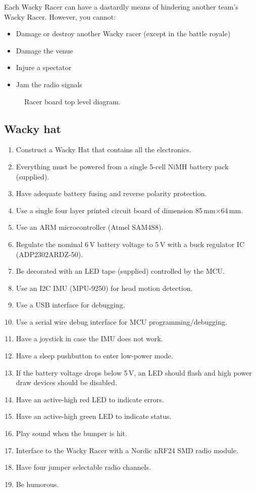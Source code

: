\documentclass[11pt, a4paper]{article}
\begin{document}
Each Wacky Racer can have a dastardly means of hindering another
team's Wacky Racer.  However, you cannot:
%
\begin{itemize}
\item Damage or destroy another Wacky racer (except in the battle royale)
\item Damage the venue
\item Injure a spectator
\item Jam the radio signals
\end{itemize}


\vspace{1cm}

\begin{figure}[h]
    \centering
    
    \caption{Racer board top level diagram.}
\end{figure}


\vfill\pagebreak

\subsection{Wacky hat}


\begin{enumerate}
\item Construct a Wacky Hat that contains all the electronics.
\item Everything must be powered from a single 5-cell NiMH battery pack (supplied).
\item Have adequate battery fusing and reverse polarity protection.
\item Use a single four layer printed circuit board of dimension 85\,mm$\times$64\,mm.
\item Use an ARM microcontroller (Atmel SAM4S8).
\item Regulate the nominal 6\,V battery voltage to 5\,V with a buck
  regulator IC (ADP2302ARDZ-50).
\item Be decorated with an LED tape (supplied) controlled by the MCU.
\item Use an I2C IMU (MPU-9250) for head motion detection.
\item Use a USB interface for debugging.
\item Use a serial wire debug interface for MCU programming/debugging.
\item Have a joystick in case the IMU does not work.
\item Have a sleep pushbutton to enter low-power mode.
\item If the battery voltage drops below 5\,V, an LED should flash and high power draw devices should be disabled.
\item Have an active-high red LED to indicate errors.
\item Have an active-high green LED to indicate status.
\item Play sound when the bumper is hit.
\item Interface to the Wacky Racer with a Nordic nRF24 SMD radio module.
\item Have four jumper selectable radio channels.
\item Be humorous.
\end{enumerate}
\end{document}
